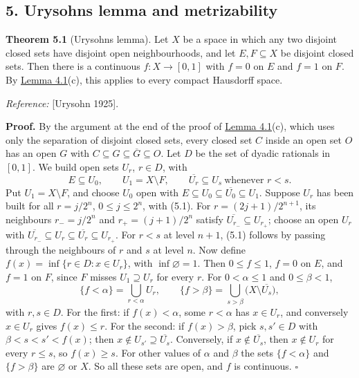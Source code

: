 \documentclass[
  english,
  11pt,
  a4paper,
]{article}
\begin{document}
\subsection[5. Urysohn\textquotesingle s lemma and
metrizability]{\texorpdfstring{\protect\hypertarget{the-stone-weierstrass-theorem-for-functions-vanishing-at-infinity--oa-fnd-sw-16}{}{}5.
Urysohn\textquotesingle s lemma and
metrizability}{5. Urysohn\textquotesingle s lemma and metrizability}}\label{the-stone-weierstrass-theorem-for-functions-vanishing-at-infinity--OA-FND-SW-16}

\textbf{Theorem 5.1} (Urysohn\textquotesingle s lemma). Let \(X\) be a
space in which any two disjoint closed sets have disjoint open
neighbourhoods, and let \(E,F\subseteq X\) be disjoint closed sets. Then
there is a continuous \(f:X\to[0,1]\) with \(f=0\) on \(E\) and \(f=1\)
on \(F\). By
\hyperlink{the-stone-weierstrass-theorem-for-functions-vanishing-at-infinity--oa-fnd-sw-15}{Lemma
4.1}(c), this applies to every compact Hausdorff space.

\emph{Reference:} {[}Urysohn 1925{]}.

\textbf{Proof.} By the argument at the end of the proof of
\hyperlink{the-stone-weierstrass-theorem-for-functions-vanishing-at-infinity--oa-fnd-sw-15}{Lemma
4.1}(c), which uses only the separation of disjoint closed sets, every
closed set \(C\) inside an open set \(O\) has an open \(G\) with
\(C\subseteq G\subseteq\overline G\subseteq O\). Let \(D\) be the set of
dyadic rationals in \([0,1]\). We build open sets \(U_r\), \(r\in D\),
with
\[E\subseteq U_0,\qquad U_1=X\setminus F,\qquad\overline{U_r}\subseteq U_s\ \text{whenever }r<s .
\tag{5.1}\] Put \(U_1=X\setminus F\), and choose \(U_0\) open with
\(E\subseteq U_0\subseteq\overline{U_0}\subseteq U_1\). Suppose \(U_r\)
has been built for all \(r=j/2^n\), \(0\leq j\leq2^n\), with (5.1). For
\(r=(2j+1)/2^{n+1}\), its neighbours \(r_-=j/2^n\) and \(r_+=(j+1)/2^n\)
satisfy \(\overline{U_{r_-}}\subseteq U_{r_+}\); choose an open \(U_r\)
with
\(\overline{U_{r_-}}\subseteq U_r\subseteq\overline{U_r}\subseteq U_{r_+}\).
For \(r<s\) at level \(n+1\), (5.1) follows by passing through the
neighbours of \(r\) and \(s\) at level \(n\). Now define
\(f(x)=\inf\{r\in D:x\in U_r\}\), with \(\inf\varnothing=1\). Then
\(0\leq f\leq1\), \(f=0\) on \(E\), and \(f=1\) on \(F\), since \(F\)
misses \(U_1\supseteq U_r\) for every \(r\). For \(0<\alpha\leq1\) and
\(0\leq\beta<1\),
\[\{f<\alpha\}=\bigcup_{r<\alpha}U_r,\qquad\{f>\beta\}=\bigcup_{s>\beta}\bigl(X\setminus\overline{U_s}\bigr),\]
with \(r,s\in D\). For the first: if \(f(x)<\alpha\), some \(r<\alpha\)
has \(x\in U_r\), and conversely \(x\in U_r\) gives \(f(x)\leq r\). For
the second: if \(f(x)>\beta\), pick \(s,s'\in D\) with
\(\beta<s<s'<f(x)\); then \(x\notin U_{s'}\supseteq\overline{U_s}\).
Conversely, if \(x\notin\overline{U_s}\), then \(x\notin U_r\) for every
\(r\leq s\), so \(f(x)\geq s\). For other values of \(\alpha\) and
\(\beta\) the sets \(\{f<\alpha\}\) and \(\{f>\beta\}\) are
\(\varnothing\) or \(X\). So all these sets are open, and \(f\) is
continuous. \(\square\)
\end{document}
